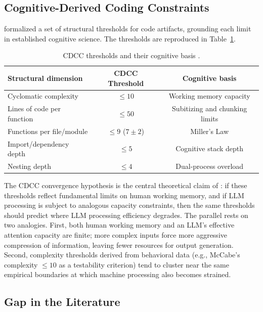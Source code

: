 \documentclass[11pt,a4paper]{article}
\begin{document}
\subsection{Cognitive-Derived Coding Constraints}

\citet{pereira2026b} formalized a set of structural thresholds for code
artifacts, grounding each limit in established cognitive science. The
thresholds are reproduced in Table~\ref{tab:cdcc}.

\begin{table}[h]
\centering
\footnotesize
\setlength{\tabcolsep}{5pt}
\caption{CDCC thresholds and their cognitive basis \citep{pereira2026b}.}
\label{tab:cdcc}
\begin{tabular}{lcc}
\toprule
Structural dimension & CDCC Threshold & Cognitive basis \\
\midrule
Cyclomatic complexity      & $\leq 10$          & Working memory capacity \citep{miller1956} \\
Lines of code per function & $\leq 50$          & Subitizing and chunking limits \\
Functions per file/module  & $\leq 9$ ($7\pm2$) & Miller's Law \\
Import/dependency depth    & $\leq 5$           & Cognitive stack depth \citep{sweller1988} \\
Nesting depth              & $\leq 4$           & Dual-process overload \citep{kahneman2011} \\
\bottomrule
\end{tabular}
\end{table}

The CDCC convergence hypothesis is the central theoretical claim of
\citeauthor{pereira2026b}: if these thresholds reflect fundamental limits on
human working memory, and if LLM processing is subject to analogous capacity
constraints, then the same thresholds should predict where LLM processing
efficiency degrades. The parallel rests on two analogies. First, both human
working memory and an LLM's effective attention capacity are finite; more
complex inputs force more aggressive compression of information, leaving
fewer resources for output generation. Second, complexity thresholds derived
from behavioral data (e.g., McCabe's complexity $\leq 10$ as a testability
criterion) tend to cluster near the same empirical boundaries at which
machine processing also becomes strained.

\subsection{Gap in the Literature}
\end{document}
